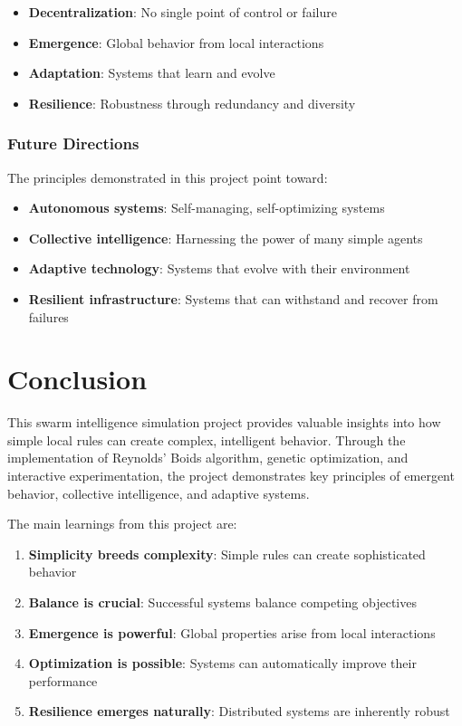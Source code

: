 \documentclass[12pt,a4paper]{article}
\begin{document}
\begin{itemize}
    \item \textbf{Decentralization}: No single point of control or failure
    \item \textbf{Emergence}: Global behavior from local interactions
    \item \textbf{Adaptation}: Systems that learn and evolve
    \item \textbf{Resilience}: Robustness through redundancy and diversity
\end{itemize}

\subsubsection{Future Directions}
The principles demonstrated in this project point toward:

\begin{itemize}
    \item \textbf{Autonomous systems}: Self-managing, self-optimizing systems
    \item \textbf{Collective intelligence}: Harnessing the power of many simple agents
    \item \textbf{Adaptive technology}: Systems that evolve with their environment
    \item \textbf{Resilient infrastructure}: Systems that can withstand and recover from failures
\end{itemize}

\section{Conclusion}

This swarm intelligence simulation project provides valuable insights into how simple local rules can create complex, intelligent behavior. Through the implementation of Reynolds' Boids algorithm, genetic optimization, and interactive experimentation, the project demonstrates key principles of emergent behavior, collective intelligence, and adaptive systems.

The main learnings from this project are:

\begin{enumerate}
    \item \textbf{Simplicity breeds complexity}: Simple rules can create sophisticated behavior
    \item \textbf{Balance is crucial}: Successful systems balance competing objectives
    \item \textbf{Emergence is powerful}: Global properties arise from local interactions
    \item \textbf{Optimization is possible}: Systems can automatically improve their performance
    \item \textbf{Resilience emerges naturally}: Distributed systems are inherently robust
\end{enumerate}
\end{document}
